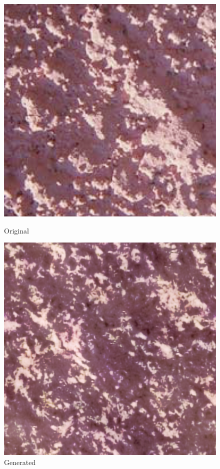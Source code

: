 \documentclass{article}
\begin{document}
    \begin{figure}[!htb]
    \begin{center}
      \includegraphics[scale=.32]{5/report/steerable/2.png}
      \caption{Original}
    \end{center}
    \endminipage \hfill
    \begin{center}
      \includegraphics[scale=.32]{5/report/steerable/2_c.png}
      \caption{Generated}
    \end{center}
    \endminipage
    \end{figure} 
\end{document}
